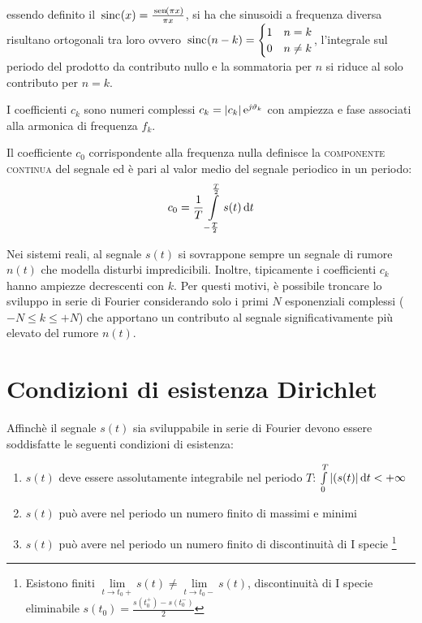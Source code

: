 essendo definito il $\,{\operatorname{sinc}}^{}\!\left({x}\right)=\frac{\,{\operatorname{sen}}^{}\!\left({\pi x}\right)}{\pi x}$, si ha che sinusoidi a frequenza diversa risultano ortogonali tra loro ovvero 
$\,{\operatorname{sinc}}^{}\!\left({n-k}\right)=\begin{cases}
	1 & n=k \\
	0 & n\neq k
\end{cases}$, l'integrale sul periodo del prodotto da contributo nullo e la sommatoria per $n$ si riduce al solo contributo per $n=k$.

I coefficienti $c_k$ sono numeri complessi $c_k=\left|{c_k}\right|\operatorname{e}^{\operatorname{\mathit{j}\!}\vartheta_k}$ con ampiezza e fase associati alla armonica di frequenza $f_k$.

Il coefficiente $c_0$ corrispondente alla frequenza nulla definisce la \textsc{componente continua} del segnale ed è pari al valor medio del segnale periodico in un periodo:
\begin{equation}
	c_0=\frac{1}{T}\int\limits_{-\frac{T}{2}}^{\frac{T}{2}}{s(t)}{\,\mathop{}\!\mathrm{d}{t}}
\end{equation}

\begin{nota}
	Nei sistemi reali, al segnale $s(t)$ si sovrappone sempre un segnale di rumore $n(t)$ che modella disturbi impredicibili. Inoltre, tipicamente i coefficienti $c_k$ hanno ampiezze decrescenti con $k$. Per questi motivi, è possibile troncare lo sviluppo in serie di Fourier considerando solo i primi $N$ esponenziali complessi ($-N\leq k \leq +N$) che apportano un contributo al segnale significativamente più elevato del rumore $n(t)$.
\end{nota}

\section{Condizioni di esistenza Dirichlet}
Affinchè il segnale $s(t)$ sia sviluppabile in serie di Fourier devono essere soddisfatte le seguenti condizioni di esistenza:
\begin{enumerate}
\item $s(t)$ deve essere assolutamente integrabile nel periodo $T$: $\int\limits_{0}^{T}{\left|{(s(t)}\right|}{\,\mathop{}\!\mathrm{d}{t}}<+\infty$
\item $s(t)$ può avere nel periodo un numero finito di massimi e minimi
\item $s(t)$ può avere nel periodo un numero finito di discontinuità di I specie
\footnote{Esistono finiti $\lim\limits_{t\to t_0+}s(t)\neq\lim\limits_{t\to t_0-}s(t)$, discontinuità di I specie eliminabile $s(t_0)=\frac{s(t_0^+)-s(t_0^-)}{2}$}
\end{enumerate}


